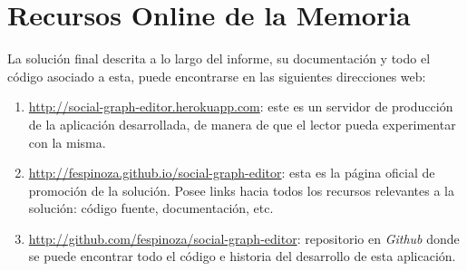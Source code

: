 \section{Recursos Online de la Memoria} %
\label{sec:recursos_online_memoria}

La solución final descrita a lo largo del informe, su documentación y todo el código asociado a esta, puede encontrarse en las siguientes direcciones web:

  \begin{enumerate}
    \item \url{http://social-graph-editor.herokuapp.com}: este es un servidor de producción de la aplicación desarrollada, de manera de que el lector pueda experimentar con la misma.
    \item \url{http://fespinoza.github.io/social-graph-editor}: esta es la página oficial de promoción de la solución. Posee links hacia todos los recursos relevantes a la solución: código fuente, documentación, etc.
    \item \url{http://github.com/fespinoza/social-graph-editor}: repositorio en \emph{Github} donde se puede encontrar todo el código e historia del desarrollo de esta aplicación.
  \end{enumerate}

